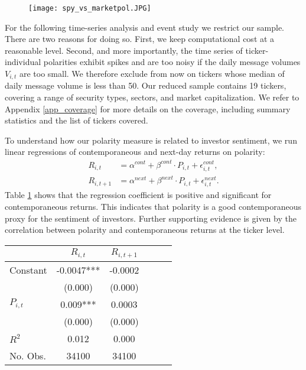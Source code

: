 \begin{figure}[h]
    \centering
    \texttt{[image: spy\_vs\_marketpol.JPG]}
    \label{fig:marketpolspy}
\end{figure}


For the following time-series analysis and event study we restrict our sample. There are two reasons for doing so. First, we keep computational cost at a reasonable level. Second, and more importantly, the time series of ticker-individual polarities exhibit spikes and are too noisy if the daily message volumes $V_{i,t}$ are too small. We therefore exclude from now on tickers whose median of daily message volume is less than 50. Our reduced sample contains 19 tickers, covering a range of security types, sectors, and market capitalization. We refer to Appendix \ref{app_coverage} for more details on the coverage, including summary statistics and the list of tickers covered.

To understand how our polarity measure is related to investor sentiment, we run linear regressions of contemporaneous and next-day returns on polarity:
\begin{align}
    R_{i,t} &= \alpha^{cont} + \beta^{cont} \cdot P_{i,t} + \epsilon^{cont}_{i,t}, \\
    R_{i,t+1} &= \alpha^{next} + \beta^{next} \cdot P_{i,t} + \epsilon^{next}_{i,t}.
\end{align}
Table \ref{regpolret} shows that the regression coefficient is positive and significant for contemporaneous returns. This indicates that polarity is a good contemporaneous proxy for the sentiment of investors. Further supporting evidence is given by the correlation between polarity and contemporaneous returns at the ticker level. 

\begin{table}[h]
\centering
\begin{tabular}{l|c|c|c|c|c}
                     & $R_{i,t}$  & $R_{i,t+1}$        \\ \hline   
Constant             & -0.0047***  & -0.0002      \\
                     & (0.000)     & (0.000)      \\
$P_{i,t}$           & 0.009***      & 0.0003       \\
                     & (0.000)       & (0.000)      \\ \hline
$R^2$                & 0.012         & 0.000             \\
No. Obs.             & 34100         & 34100            
\end{tabular}
\label{regpolret}
\end{table}


